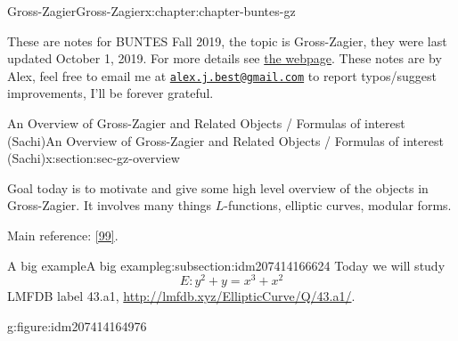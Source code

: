 \documentclass[oneside,10pt,]{book}
\numberwithin{equation}{section}
\begin{document}
\begin{chapterptx}{Gross-Zagier}{}{Gross-Zagier}{}{}{x:chapter:chapter-buntes-gz}
\begin{introduction}{}%
These are notes for BUNTES Fall 2019, the topic is Gross-Zagier, they were last updated October 1, 2019. For more details see \href{http://math.bu.edu/people/svh/GrossZagier.html}{the webpage}. These notes are by Alex, feel free to email me at \href{mailto:alex.j.best@gmail.com}{\nolinkurl{alex.j.best@gmail.com}} to report typos\slash{}suggest improvements, I'll be forever grateful.%
\end{introduction}%
%
%
\typeout{************************************************}
\typeout{************************************************}
%
\begin{sectionptx}{An Overview of Gross-Zagier and Related Objects \slash{} Formulas of interest (Sachi)}{}{An Overview of Gross-Zagier and Related Objects \slash{} Formulas of interest (Sachi)}{}{}{x:section:sec-gz-overview}
\begin{introduction}{}%
Goal today is to motivate and give some high level overview of the objects in Gross-Zagier. It involves many things \(L\)-functions, elliptic curves, modular forms.%
\par
Main reference: \hyperlink{x:biblio:bib-zagier-modular}{[99]}.%
\end{introduction}%
%
%
\typeout{************************************************}
\typeout{************************************************}
%
\begin{subsectionptx}{A big example}{}{A big example}{}{}{g:subsection:idm207414166624}
Today we will study%
\begin{equation*}
E\colon y^2 + y=  x^3 + x^2
\end{equation*}
LMFDB label 43.a1, \url{http://lmfdb.xyz/EllipticCurve/Q/43.a1/}.%
\begin{figureptx}{}{g:figure:idm207414164976}{}%
\begin{image}{0}{1}{0}%
\end{image}
\end{figureptx}
\end{subsectionptx}
\end{sectionptx}
\end{chapterptx}
\end{document}
